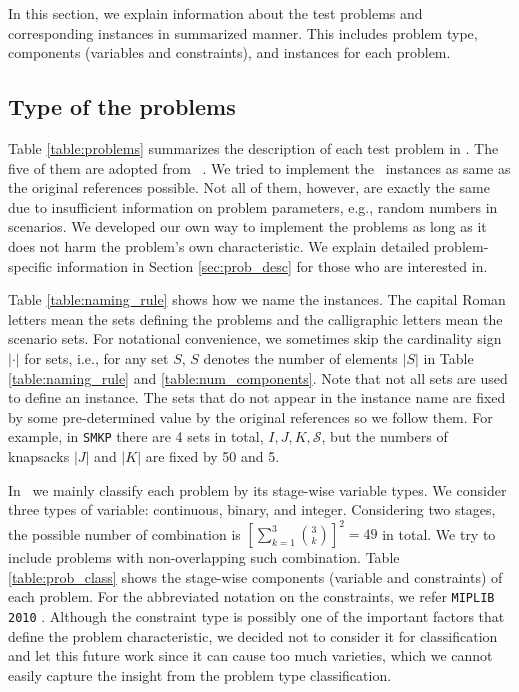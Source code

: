 In this section, we explain information about the test problems and corresponding instances in summarized manner. This includes problem type, components (variables and constraints), and instances for each problem.  

\subsection{Type of the problems}
Table \ref{table:problems} summarizes the description of each test problem in \siplibtwo. The five of them are adopted from \siplib\ \cite{web:SIPLIB1}. We tried to implement the \siplib\ instances as same as the original references possible. Not all of them, however, are exactly the same due to insufficient information on problem parameters, e.g., random numbers in scenarios. We developed our own way to implement the problems as long as it does not harm the problem's own characteristic. We explain detailed problem-specific information in Section \ref{sec:prob_desc} for those who are interested in.


Table \ref{table:naming_rule} shows how we name the instances. The capital Roman letters mean the sets defining the problems and the calligraphic letters mean the scenario sets. For notational convenience, we sometimes skip the cardinality sign $|\cdot|$ for sets, i.e., for any set $S$, $S$ denotes the number of elements $|S|$ in Table \ref{table:naming_rule} and \ref{table:num_components}. Note that not all sets are used to define an instance. The sets that do not appear in the instance name are fixed by some pre-determined value by the original references so we follow them. For example, in \texttt{SMKP} there are 4 sets in total, $I,J,K,\mathcal{S}$, but the numbers of knapsacks $|J|$ and $|K|$ are fixed by 50 and 5.


In \siplibtwo\, we mainly classify each problem by its stage-wise variable types. We consider three types of variable: continuous, binary, and integer. Considering two stages, the possible number of combination is $\left[\sum_{k=1}^3\binom{3}{k}\right]^2=49$ in total. We try to include problems with non-overlapping such combination. Table \ref{table:prob_class} shows the stage-wise components (variable and constraints) of each problem. For the abbreviated notation on the constraints, we refer \texttt{MIPLIB 2010} \cite{MIPLIB}. Although the constraint type is possibly one of the important factors that define the problem characteristic, we decided not to consider it for classification and let this future work since it can cause too much varieties, which we cannot easily capture the insight from the problem type classification. 


